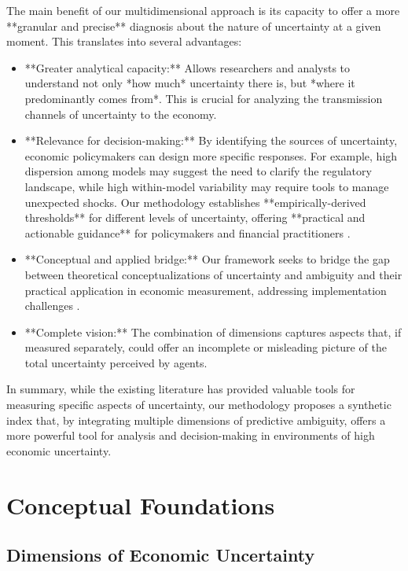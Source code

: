 \documentclass[5p,authoryear]{elsarticle}
\begin{document}
The main benefit of our multidimensional approach is its capacity to offer a more **granular and precise** diagnosis about the nature of uncertainty at a given moment. This translates into several advantages:
\begin{itemize}
    \item **Greater analytical capacity:** Allows researchers and analysts to understand not only *how much* uncertainty there is, but *where it predominantly comes from*. This is crucial for analyzing the transmission channels of uncertainty to the economy.
    \item **Relevance for decision-making:** By identifying the sources of uncertainty, economic policymakers can design more specific responses. For example, high dispersion among models may suggest the need to clarify the regulatory landscape, while high within-model variability may require tools to manage unexpected shocks. Our methodology establishes **empirically-derived thresholds** for different levels of uncertainty, offering **practical and actionable guidance** for policymakers and financial practitioners \cite{risk_analysis}.
    \item **Conceptual and applied bridge:** Our framework seeks to bridge the gap between theoretical conceptualizations of uncertainty and ambiguity and their practical application in economic measurement, addressing implementation challenges \cite{risk_analysis}.
    \item **Complete vision:** The combination of dimensions captures aspects that, if measured separately, could offer an incomplete or misleading picture of the total uncertainty perceived by agents.
\end{itemize}

In summary, while the existing literature has provided valuable tools for measuring specific aspects of uncertainty, our methodology proposes a synthetic index that, by integrating multiple dimensions of predictive ambiguity, offers a more powerful tool for analysis and decision-making in environments of high economic uncertainty.

\section{Conceptual Foundations}

\subsection{Dimensions of Economic Uncertainty}
\end{document}

